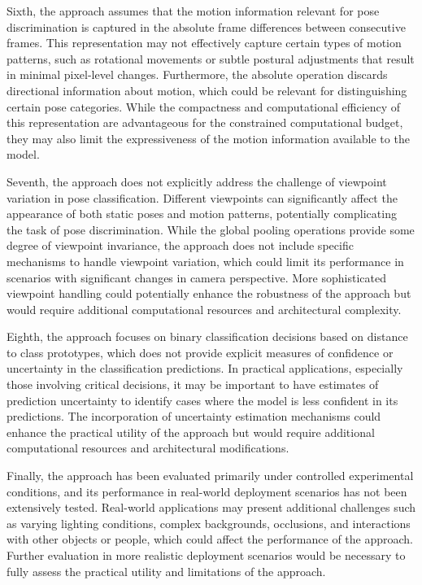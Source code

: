 \documentclass[11pt]{article}
\begin{document}
Sixth, the approach assumes that the motion information relevant for pose discrimination is captured in the absolute frame differences between consecutive frames. This representation may not effectively capture certain types of motion patterns, such as rotational movements or subtle postural adjustments that result in minimal pixel-level changes. Furthermore, the absolute operation discards directional information about motion, which could be relevant for distinguishing certain pose categories. While the compactness and computational efficiency of this representation are advantageous for the constrained computational budget, they may also limit the expressiveness of the motion information available to the model.

Seventh, the approach does not explicitly address the challenge of viewpoint variation in pose classification. Different viewpoints can significantly affect the appearance of both static poses and motion patterns, potentially complicating the task of pose discrimination. While the global pooling operations provide some degree of viewpoint invariance, the approach does not include specific mechanisms to handle viewpoint variation, which could limit its performance in scenarios with significant changes in camera perspective. More sophisticated viewpoint handling could potentially enhance the robustness of the approach but would require additional computational resources and architectural complexity.

Eighth, the approach focuses on binary classification decisions based on distance to class prototypes, which does not provide explicit measures of confidence or uncertainty in the classification predictions. In practical applications, especially those involving critical decisions, it may be important to have estimates of prediction uncertainty to identify cases where the model is less confident in its predictions. The incorporation of uncertainty estimation mechanisms could enhance the practical utility of the approach but would require additional computational resources and architectural modifications.

Finally, the approach has been evaluated primarily under controlled experimental conditions, and its performance in real-world deployment scenarios has not been extensively tested. Real-world applications may present additional challenges such as varying lighting conditions, complex backgrounds, occlusions, and interactions with other objects or people, which could affect the performance of the approach. Further evaluation in more realistic deployment scenarios would be necessary to fully assess the practical utility and limitations of the approach.
\end{document}
